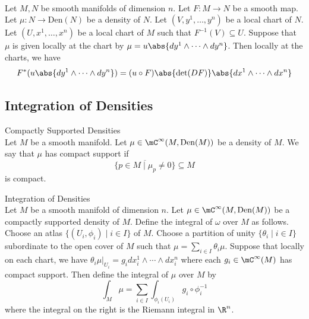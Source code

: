 \documentclass[a4paper]{article}
\begin{document}
\begin{prp}{}{}\\
Let $M,N$ be smooth manifolds of dimension $n$. Let $F:M\to N$ be a smooth map. Let $\mu:N\to\text{Den}(N)$ be a density of $N$. Let $(V,y^1,\dots,y^n)$ be a local chart of $N$. Let $(U,x^1,\dots,x^n)$ be a local chart of $M$ such that $F^{-1}(V)\subseteq U$. Suppose that $\mu$ is given locally at the chart by $\mu=u\abs{dy^1\wedge\cdots\wedge dy^n}$. Then locally at the charts, we have $$F^\ast(u\abs{dy^1\wedge\cdots\wedge dy^n})=(u\circ F)\abs{\det(DF)}\abs{dx^1\wedge\cdots\wedge dx^n}$$
\end{prp}

\subsection{Integration of Densities}
\begin{defn}{Compactly Supported Densities}{}\\
Let $M$ be a smooth manifold. Let $\mu\in\mC^\infty(M,\text{Den}(M))$ be a density of $M$. We say that $\mu$ has compact support if $$\overline{\{p\in M\;|\;\mu_p\neq 0\}}\subseteq M$$ is compact. 
\end{defn}

\begin{defn}{Integration of Densities}{}\\
Let $M$ be a smooth manifold of dimension $n$. Let $\mu\in\mC^\infty(M,\text{Den}(M))$ be a compactly supported density of $M$. Define the integral of $\omega$ over $M$ as follows. Choose an atlas $\{(U_i,\phi_i)\;|\;i\in I\}$ of $M$. Choose a partition of unity $\{\theta_i\;|\;i\in I\}$ subordinate to the open cover of $M$ such that $\mu=\sum_{i\in I}\theta_i\mu$. Suppose that locally on each chart, we have $\theta_i\mu|_{U_i}=g_i dx_i^1\wedge\cdots\wedge dx_i^n$ where each $g_i\in\mC^\infty(M)$ has compact support. Then define the integral of $\mu$ over $M$ by $$\int_M\mu=\sum_{i\in I}\int_{\phi_i(U_i)}g_i\circ\phi_i^{-1}$$ where the integral on the right is the Riemann integral in $\R^n$. 
\end{defn}
\end{document}
